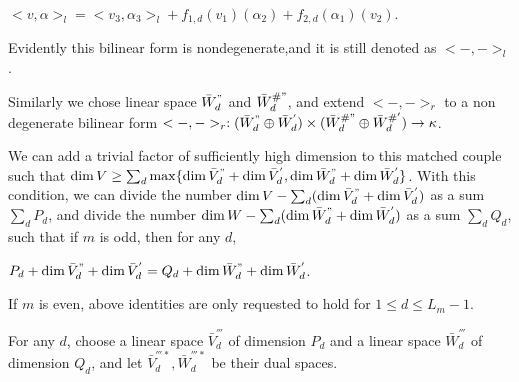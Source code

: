 \def\CTEXPreproc{Created by ctex v0.2.12, don't edit!}\documentclass[11pt]{article}
\begin{document}
\begin{pf}
     $< v, \alpha >_l = < v_3 , \alpha_3  >_l + f_{1,d} (v_1 )( \alpha_2  )+ f_{2,d} (\alpha_1 )( v_2 ) $.

    Evidently this bilinear form is nondegenerate,and it is still denoted as $<-,->_l $.








     Similarly we chose linear space $\bar{W}^{"}_d$ and $\bar{W}^{\# "}_d $, and extend $<-,->_r$ to a non degenerate bilinear form
     $<-,->_r : (\bar{W}^{"}_d \oplus \bar{W}^{'}_d ) \times  (\bar{W}^{\# "}_d \oplus \bar{W}^{\# '}_d )\rightarrow \kappa  $.

We can add a trivial factor of sufficiently high dimension to this matched couple such that
$\dim V \geq  \sum_{d}  \max \{ \dim \bar{V}^{"}_d +\dim \bar{V}^{'}_d  , \dim \bar{W}^{"}_d +\dim \bar{W}^{'}_d    \} $. With this condition, we can divide the number $\dim V - \sum_{d} (\dim \bar{V}^{"}_d +\dim \bar{V}^{'}_d    ) $ as a sum $\sum_d P_d   $, and  divide the number $\dim W - \sum_{d} (\dim \bar{W}^{"}_d +\dim \bar{W}^{'}_d    ) $ as a sum $\sum_d Q_d   $, such that if $m$ is odd, then
for any $d$,

$P_d + \dim \bar{V}^{"}_d +\dim \bar{V}^{'}_d  = Q_d + \dim \bar{W}^{"}_d +\dim \bar{W}^{'}_d $.

If $m$ is even, above identities are only requested to hold for $1\leq d\leq L_m -1  $.

     For any $d$, choose a linear space $\bar{V}^{'''}_d$ of dimension $P_d$ and a linear space $\bar{W}^{'''}_d$ of dimension $Q_d$,  and   let $ \bar{V}^{'''*}_d  , \bar{W}^{'''*}_d$ be their dual spaces.


\end{pf}
\end{document}
